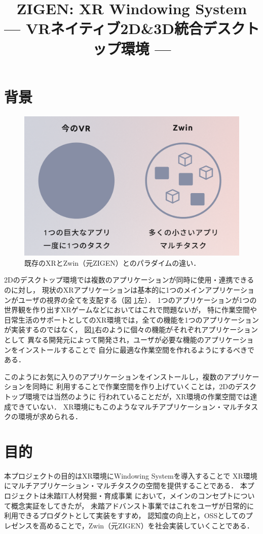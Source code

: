 \documentclass[12pt,a4paper]{jsarticle}
\title{
  ZIGEN: XR Windowing System\\
  --- VRネイティブ2D\&3D統合デスクトップ環境 --- 
}
\date{\vspace{-5em}}
\begin{document}
\maketitle

\section{背景}

\begin{figure}[htbp]
  \centering
  \includegraphics[keepaspectratio, width=0.6\linewidth]{fig/apps.png}
  \caption{既存のXRとZwin（元ZIGEN）とのパラダイムの違い．}
  \label{fig:apps}
\end{figure}

2Dのデスクトップ環境では複数のアプリケーションが同時に使用・連携できるのに対し，
現状のXRアプリケーションは基本的に1つのメインアプリケーションがユーザの視界の全てを支配する（図 \ref{fig:apps}左）．
1つのアプリケーションが1つの世界観を作り出すXRゲームなどにおいてはこれで問題ないが，
特に作業空間や日常生活のサポートとしてのXR環境では，全ての機能を1つのアプリケーションが実装するのではなく，
図\ref{fig:apps}右のように個々の機能がそれぞれアプリケーションとして
異なる開発元によって開発され，ユーザが必要な機能のアプリケーションをインストールすることで
自分に最適な作業空間を作れるようにするべきである．

このようにお気に入りのアプリケーションをインストールし，複数のアプリケーションを同時に
利用することで作業空間を作り上げていくことは，2Dのデスクトップ環境では当然のように
行われていることだが，XR環境の作業空間では達成できていない．
XR環境にもこのようなマルチアプリケーション・マルチタスクの環境が求められる．

\section{目的}
本プロジェクトの目的はXR環境にWindowing Systemを導入することで
XR環境にマルチアプリケーション・マルチタスクの空間を提供することである．
本プロジェクトは未踏IT人材発掘・育成事業
において，メインのコンセプトについて概念実証をしてきたが，
未踏アドバンスト事業ではこれをユーザが日常的に利用できるプロダクトとして実装をすすめ，
認知度の向上と，OSSとしてのプレゼンスを高めることで，Zwin（元ZIGEN）を社会実装していくことである．
\end{document}
